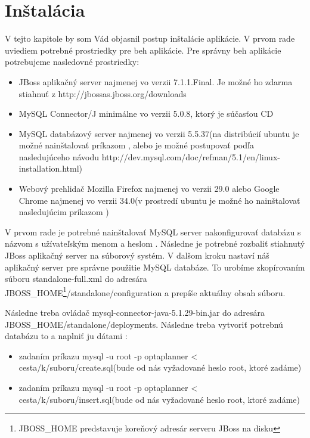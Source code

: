 \chapter{Inštalácia}
{
	V tejto kapitole by som Vád objasnil postup inštalácie aplikácie. V prvom rade uviediem potrebné prostriedky pre beh aplikácie. Pre správny beh aplikácie potrebujeme nasledovné prostriedky:
	\begin{itemize}
	\item JBoss aplikačný server najmenej vo verzii 7.1.1.Final. Je možné ho zdarma stiahnuť z http://jbossas.jboss.org/downloads
	\item MySQL Connector/J minimálne vo verzii 5.0.8, ktorý je súčasťou CD
	\item MySQL databázový server najmenej vo verzii 5.5.37(na distribúcií ubuntu je možné nainštalovať príkazom , alebo je možné postupovať podľa nasledujúceho návodu http://dev.mysql.com/doc/refman/5.1/en/linux-installation.html)
	\item Webový prehlidač Mozilla Firefox najmenej vo verzii 29.0 alebo Google Chrome najmenej vo verzii 34.0(v prostredí ubuntu je možné ho nainštalovať nasledujúcim príkazom )
	\end{itemize}
	V prvom rade je potrebné nainštalovať MySQL server nakonfigurovať databázu s názvom  s užívateľským menom  a heslom . Následne je potrebné rozbaliť stiahnutý JBoss aplikačný server na súborový systém. V ďalšom kroku nastaví náš aplikačný server pre správne použitie MySQL databáze.  To urobíme zkopírovaním súboru standalone-full.xml do adresára JBOSS\_HOME\footnote{JBOSS_HOME predstavuje koreňový adresár serveru JBoss na disku}/standalone/configuration a prepíše aktuálny obsah súboru.

	Následne treba ovládač mysql-connector-java-5.1.29-bin.jar do adresára JBOSS\_HOME/standalone/deployments. Následne treba vytvoriť potrebnú databázu to a naplniť ju dátami :
	\begin{itemize}
	\item zadaním príkazu mysql -u root -p optaplanner < cesta/k/suboru/create.sql(bude od nás vyžadované heslo root, ktoré zadáme)
	\item zadaním príkazu mysql -u root -p optaplanner < cesta/k/suboru/insert.sql(bude od nás vyžadované heslo root, ktoré zadáme)
	\end{itemize}

}

